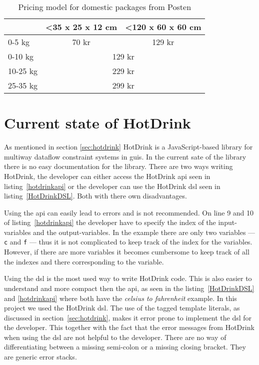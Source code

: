 \begin{table}[h]
    \centering
    \caption{Pricing model for domestic packages from Posten}
    \label{pricingmodel}
    \begin{tabular}{|l|cl|}
    \hline
             & \multicolumn{1}{l|}{\textless 35 x 25 x 12 cm} & \textless 120 x 60 x 60 cm  \\ \hline
    0-5 kg   & \multicolumn{1}{c|}{70 kr}                     & \multicolumn{1}{c|}{129 kr} \\ \hline
    0-10 kg  & \multicolumn{2}{c|}{129 kr}                                                  \\ \hline
    10-25 kg & \multicolumn{2}{c|}{229 kr}                                                  \\ \hline
    25-35 kg & \multicolumn{2}{c|}{299 kr}                                                  \\ \hline
    \end{tabular}
\end{table}

\section{Current state of HotDrink}

As mentioned in section \ref{sec:hotdrink} HotDrink is a JavaScript-based library for
multiway dataflow constraint systems in \gls{gui}s. In the current sate of the library 
there is no easy documentation for the library. There are two ways writing HotDrink, 
the developer can either access the HotDrink \gls{api} seen in listing~\ref{hotdrinkapi} 
or the developer can use the HotDrink \gls{dsl} seen in listing~\ref{HotDrinkDSL}. Both 
with there own disadvantages.

Using the \gls{api} can easily lead to errors and is not recommended. On line 9 and 10 
of listing~\ref{hotdrinkapi} the developer have to specify the index of the 
input-variables and the output-variables. In the example there are only two variables 
--- \texttt{c} and \texttt{f} --- thus it is not complicated to keep track of the index 
for the variables. However, if there are more variables it becomes cumbersome to keep 
track of all the indexes and there corresponding to the variable.

Using the \gls{dsl} is the most used way to write HotDrink code. This is also easier to 
understand and more compact then the \gls{api}, as seen in the listing~\ref{HotDrinkDSL} 
and \ref{hotdrinkapi} where both have the \textit{celsius to fahrenheit} example. In 
this project we used the HotDrink \gls{dsl}. The use of the tagged template literals, as 
discussed in section~\ref{sec:hotdrink}, makes it error prone to implement the \gls{dsl} 
for the developer. This together with the fact that the error messages from HotDrink when 
using the \gls{dsl} are not helpful to the developer. There are no way of differentiating 
between a missing semi-colon or a missing closing bracket. They are generic error 
stacks. 

